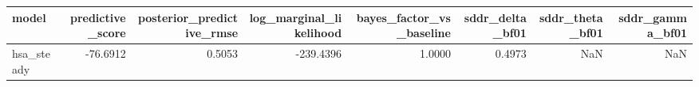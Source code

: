 \begin{tabular}{lrrrrrrr}
\toprule
model & predictive\_score & posterior\_predictive\_rmse & log\_marginal\_likelihood & bayes\_factor\_vs\_baseline & sddr\_delta\_bf01 & sddr\_theta\_bf01 & sddr\_gamma\_bf01 \\
\midrule
hsa\_steady & -76.6912 & 0.5053 & -239.4396 & 1.0000 & 0.4973 & NaN & NaN \\
\bottomrule
\end{tabular}
